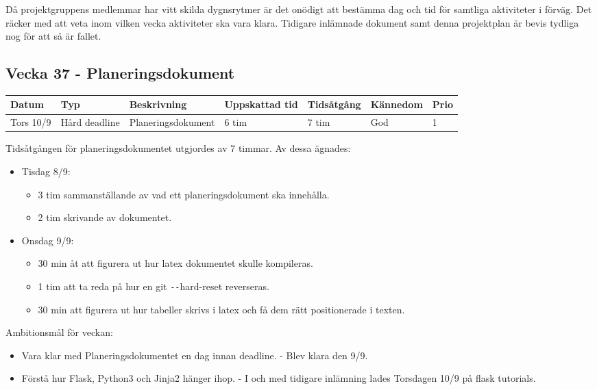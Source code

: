 \documentclass{TDP003mall}
\begin{document}
 Då projektgruppens medlemmar har vitt skilda dygnsrytmer är det onödigt att bestämma dag och tid för samtliga aktiviteter i förväg. Det räcker med att veta inom vilken vecka aktiviteter ska vara klara. Tidigare inlämnade dokument samt denna projektplan är bevis tydliga nog för att så är fallet.

 \subsection*{Vecka 37 - Planeringsdokument}
 
\begin{tabularx}{\linewidth}{|l|l|X|l|l|l|l|}
  \hline
  Datum     & Typ           & Beskrivning        & Uppskattad tid & Tidsåtgång & Kännedom & Prio \\ [0.5ex]
  \hline                                             
  Tors 10/9 & Hård deadline & Planeringsdokument & 6 tim          & 7 tim      & God      & 1    \\
  \hline
\end{tabularx}

Tidsåtgången för planeringsdokumentet utgjordes av 7 timmar. Av dessa ägnades:
\begin{itemize}
  \item Tisdag 8/9:
  \begin{itemize}
    \item 3 tim sammanställande av vad ett planeringsdokument ska innehålla.
    \item 2 tim skrivande av dokumentet.
  \end{itemize}
  \item Onsdag 9/9:
  \begin{itemize}
    \item 30 min åt att figurera ut hur latex dokumentet skulle kompileras.
    \item 1 tim att ta reda på hur en git \texttt{-{}-}hard-reset reverseras.
    \item 30 min att figurera ut hur tabeller skrivs i latex och få dem rätt positionerade i texten.\\
  \end{itemize}

      \end{itemize}

      Ambitionsmål för veckan:
      \begin{itemize}
      \item Vara klar med Planeringsdokumentet en dag innan deadline. - Blev klara den 9/9.
      \item Förstå hur Flask, Python3 och Jinja2 hänger ihop. - I och med tidigare inlämning lades Torsdagen 10/9 på flask tutorials.
      \end{itemize}
      
\end{document}
